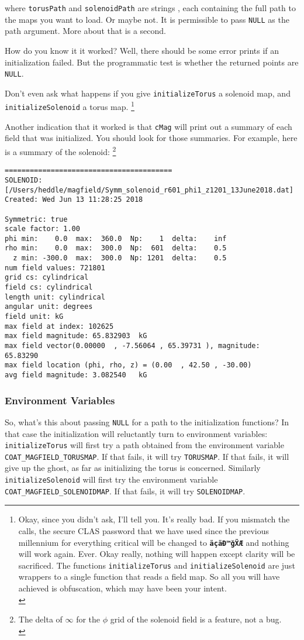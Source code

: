 \documentclass{article}
\begin{document}
where \texttt{torusPath} and \texttt{solenoidPath} are strings , each containing the full path to the maps you want to load. Or maybe not. It is permissible to pass \texttt{NULL} as the path argument. More about that is a second. 

How do you know it it worked? Well, there  should be some error prints if an initialization failed. But the programmatic test is whether the returned points are \texttt{NULL}. 

Don't even ask what happens if you give \texttt{initializeTorus} a solenoid map, and \texttt{initializeSolenoid}  a torus map. \footnote{Okay, since you didn't ask, I'll tell you. It's really bad. If you mismatch the calls, the secure CLAS password that we have used since the previous millennium for everything critical will be changed to \textbf{\texttt{äçäĐ™ǧẌÆ}} and nothing will work again. Ever. Okay really, nothing will happen except clarity will be sacrificed. The functions \texttt{initializeTorus} and \texttt{initializeSolenoid} are just wrappers to a single function that reads a field map. So all you will have achieved is obfuscation, which may have been your intent.\\}

Another indication that it worked is that \texttt{cMag} will print out a summary of each field that was initialized. You should look for those summaries. For example, here is a summary of the solenoid:
\footnote{The delta of $\infty$ for the $\phi$ grid of the solenoid field is a feature, not a bug.\\}

\begin{verbatim} 
========================================
SOLENOID: [/Users/heddle/magfield/Symm_solenoid_r601_phi1_z1201_13June2018.dat]
Created: Wed Jun 13 11:28:25 2018

Symmetric: true
scale factor: 1.00  
phi min:    0.0  max:  360.0  Np:    1  delta:    inf
rho min:    0.0  max:  300.0  Np:  601  delta:    0.5
  z min: -300.0  max:  300.0  Np: 1201  delta:    0.5
num field values: 721801
grid cs: cylindrical
field cs: cylindrical
length unit: cylindrical
angular unit: degrees
field unit: kG
max field at index: 102625
max field magnitude: 65.832903  kG
max field vector(0.00000  , -7.56064 , 65.39731 ), magnitude:     65.83290
max field location (phi, rho, z) = (0.00  , 42.50 , -30.00)
avg field magnitude: 3.082540   kG
\end{verbatim}

\subsubsection{Environment Variables}
So, what's this about passing \texttt{NULL} for a path to the initialization functions? In that case the initialization will reluctantly turn to environment variables: \texttt{initializeTorus}  will first try a path obtained from the environment variable \texttt{COAT\_MAGFIELD\_TORUSMAP}. If that fails, it will try \texttt{TORUSMAP}. If that fails, it will give up the ghost, as far as initializing the torus is concerned. Similarly \texttt{initializeSolenoid} will first try the environment variable \texttt{COAT\_MAGFIELD\_SOLENOIDMAP}. If that fails, it will try \texttt{SOLENOIDMAP}. 
\end{document}
